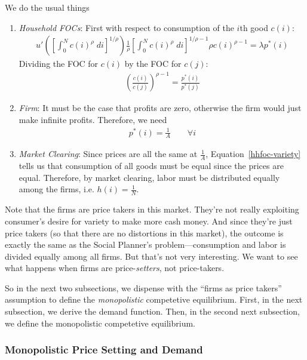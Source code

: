 \documentclass[12pt]{article}
\theoremstyle{plain}
\theoremstyle{definition}
\theoremstyle{remark}
\begin{document}
\clearpage
We do the usual things
\begin{enumerate}
  \item \emph{Household FOCs}: First with respect to consumption of the
    $i$th good $c(i)$:
    \begin{align*}
      u'\left(
        \left[ \int_0^N c(i)^\rho \; di \right]^{1/\rho}
      \right)
      \frac{1}{\rho}
      \left[ \int_0^N c(i)^\rho \; di \right]^{1/\rho-1}
      \rho c(i)^{\rho-1}
      = \lambda p^*(i)
    \end{align*}
    Dividing the FOC for $c(i)$ by the FOC for $c(j)$:
    \begin{align}
      \left(
      \frac{c(i)}{c(j)}
      \right)^{\rho-1}
      =
      \frac{p^*(i)}{p^*(j)}
      \label{hhfoc-variety}
    \end{align}

  \item \emph{Firm}: It must be the case that profits are zero,
    otherwise the firm would just make infinite profits. Therefore, we
    need
    \begin{align*}
      p^*(i) = \frac{1}{A}
      \qquad \forall i
    \end{align*}

  \item \emph{Market Clearing}: Since prices are all the same at
    $\frac{1}{A}$, Equation~\ref{hhfoc-variety} tells us that
    consumption of all goods must be equal since the prices are equal.
    Therefore, by market clearing, labor must be distributed equally
    among the firms, i.e. $h(i) = \frac{1}{N}$.
\end{enumerate}
Note that the firms are price takers in this market. They're not really
exploiting consumer's desire for variety to make more cash money.  And
since they're just price takers (so that there are no distortions in
this market), the outcome is exactly the same as the Social Planner's
problem---consumption and labor is divided equally among all firms. But
that's not very interesting. We want to see what happens when firms are
price-\emph{setters}, not price-takers.

So in the next two subsections, we dispense with the ``firms as price
takers'' assumption to define the \emph{monopolistic} competetive
equilibrium. First, in the next subsection, we derive the demand
function. Then, in the second next subsection, we define the
monopolistic competetive equilibrium.

\clearpage
\subsubsection{Monopolistic Price Setting and Demand}
\end{document}
